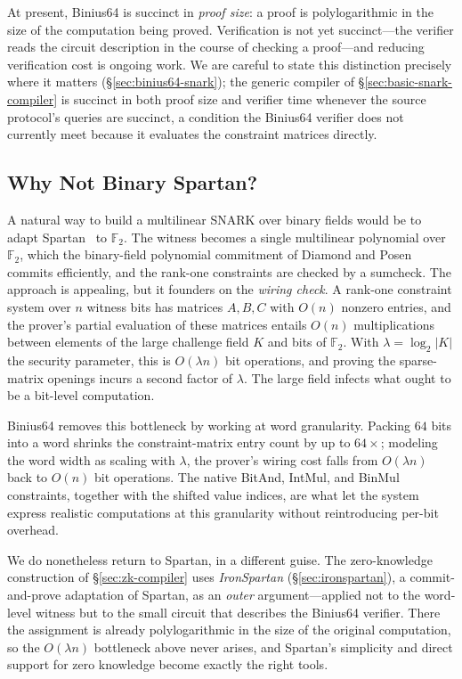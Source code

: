 \documentclass{article}
\theoremstyle{definition}
\newcommand{\FF}[1]{\mathbb{F}_{#1}}
\begin{document}
At present, Binius64 is succinct in \emph{proof size}: a proof is polylogarithmic in the size of the computation being proved. Verification is not yet succinct---the verifier reads the circuit description in the course of checking a proof---and reducing verification cost is ongoing work. We are careful to state this distinction precisely where it matters (\S\ref{sec:binius64-snark}); the generic compiler of \S\ref{sec:basic-snark-compiler} is succinct in both proof size and verifier time whenever the source protocol's queries are succinct, a condition the Binius64 verifier does not currently meet because it evaluates the constraint matrices directly.

\subsection{Why Not Binary Spartan?}

A natural way to build a multilinear SNARK over binary fields would be to adapt Spartan~\cite{Setty:2020aa} to $\FF{2}$. The witness becomes a single multilinear polynomial over $\FF{2}$, which the binary-field polynomial commitment of Diamond and Posen~\cite{Diamond:2024ab} commits efficiently, and the rank-one constraints are checked by a sumcheck. The approach is appealing, but it founders on the \emph{wiring check}. A rank-one constraint system over $n$ witness bits has matrices $A, B, C$ with $O(n)$ nonzero entries, and the prover's partial evaluation of these matrices entails $O(n)$ multiplications between elements of the large challenge field $K$ and bits of $\FF{2}$. With $\lambda = \log_2 |K|$ the security parameter, this is $O(\lambda n)$ bit operations, and proving the sparse-matrix openings incurs a second factor of $\lambda$. The large field infects what ought to be a bit-level computation.

Binius64 removes this bottleneck by working at word granularity. Packing $64$ bits into a word shrinks the constraint-matrix entry count by up to $64\times$; modeling the word width as scaling with $\lambda$, the prover's wiring cost falls from $O(\lambda n)$ back to $O(n)$ bit operations. The native BitAnd, IntMul, and BinMul constraints, together with the shifted value indices, are what let the system express realistic computations at this granularity without reintroducing per-bit overhead.

We do nonetheless return to Spartan, in a different guise. The zero-knowledge construction of \S\ref{sec:zk-compiler} uses \emph{IronSpartan} (\S\ref{sec:ironspartan}), a commit-and-prove adaptation of Spartan, as an \emph{outer} argument---applied not to the word-level witness but to the small circuit that describes the Binius64 verifier. There the assignment is already polylogarithmic in the size of the original computation, so the $O(\lambda n)$ bottleneck above never arises, and Spartan's simplicity and direct support for zero knowledge become exactly the right tools.
\end{document}
